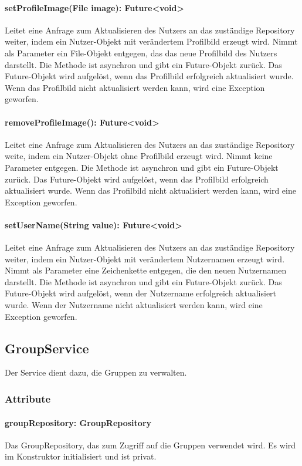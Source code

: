 \documentclass[parskip=full]{scrartcl}
\begin{document}
\paragraph{setProfileImage(File image): Future<void>}
Leitet eine Anfrage zum Aktualisieren des Nutzers an das zuständige Repository weiter, indem ein Nutzer-Objekt mit verändertem Profilbild erzeugt wird. Nimmt als Parameter ein File-Objekt entgegen, das das neue Profilbild des Nutzers darstellt. Die Methode ist asynchron und gibt ein Future-Objekt zurück. Das Future-Objekt wird aufgelöst, wenn das Profilbild erfolgreich aktualisiert wurde. Wenn das Profilbild nicht aktualisiert werden kann, wird eine Exception geworfen.
\paragraph{removeProfileImage(): Future<void>}
Leitet eine Anfrage zum Aktualisieren des Nutzers an das zuständige Repository weite, indem ein Nutzer-Objekt ohne Profilbild erzeugt wird. Nimmt keine Parameter entgegen. Die Methode ist asynchron und gibt ein Future-Objekt zurück. Das Future-Objekt wird aufgelöst, wenn das Profilbild erfolgreich aktualisiert wurde. Wenn das Profilbild nicht aktualisiert werden kann, wird eine Exception geworfen.
\paragraph{setUserName(String value): Future<void>}
Leitet eine Anfrage zum Aktualisieren des Nutzers an das zuständige Repository weiter, indem ein Nutzer-Objekt mit verändertem Nutzernamen erzeugt wird. Nimmt als Parameter eine Zeichenkette entgegen, die den neuen Nutzernamen darstellt. Die Methode ist asynchron und gibt ein Future-Objekt zurück. Das Future-Objekt wird aufgelöst, wenn der Nutzername erfolgreich aktualisiert wurde. Wenn der Nutzername nicht aktualisiert werden kann, wird eine Exception geworfen.

\subsection{GroupService}
Der Service dient dazu, die Gruppen zu verwalten.
\subsubsection{Attribute}
\paragraph{groupRepository: GroupRepository}
Das GroupRepository, das zum Zugriff auf die Gruppen verwendet wird. Es wird im Konstruktor initialisiert und ist privat.
\end{document}
